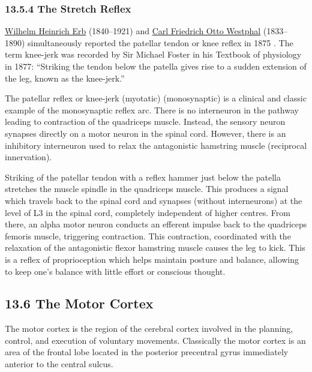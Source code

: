 \hypertarget{the-stretch-reflex}{%
\subsubsection{\texorpdfstring{{13.5.4} The Stretch
Reflex}{13.5.4 The Stretch Reflex}}\label{the-stretch-reflex}}

\href{https://en.wikipedia.org/wiki/Wilhelm_Heinrich_Erb}{Wilhelm
Heinrich Erb} (1840--1921) and
\href{https://en.wikipedia.org/wiki/Carl_Friedrich_Otto_Westphal}{Carl
Friedrich Otto Westphal} (1833--1890) simultaneously reported the
patellar tendon or knee reflex in 1875 . The term knee-jerk was recorded
by Sir Michael Foster in his Textbook of physiology in 1877: ``Striking
the tendon below the patella gives rise to a sudden extension of the
leg, known as the knee-jerk.''

The patellar reflex or knee-jerk (myotatic) (monosynaptic) is a clinical
and classic example of the monosynaptic reflex arc. There is no
interneuron in the pathway leading to contraction of the quadriceps
muscle. Instead, the sensory neuron synapses directly on a motor neuron
in the spinal cord. However, there is an inhibitory interneuron used to
relax the antagonistic hamstring muscle (reciprocal innervation).

Striking of the patellar tendon with a reflex hammer just below the
patella stretches the muscle spindle in the quadriceps muscle. This
produces a signal which travels back to the spinal cord and synapses
(without interneurons) at the level of L3 in the spinal cord, completely
independent of higher centres. From there, an alpha motor neuron
conducts an efferent impulse back to the quadriceps femoris muscle,
triggering contraction. This contraction, coordinated with the
relaxation of the antagonistic flexor hamstring muscle causes the leg to
kick. This is a reflex of proprioception which helps maintain posture
and balance, allowing to keep one's balance with little effort or
conscious thought.

\hypertarget{the-motor-cortex}{%
\subsection{\texorpdfstring{{13.6} The Motor
Cortex}{13.6 The Motor Cortex}}\label{the-motor-cortex}}

The motor cortex is the region of the cerebral cortex involved in the
planning, control, and execution of voluntary movements. Classically the
motor cortex is an area of the frontal lobe located in the posterior
precentral gyrus immediately anterior to the central sulcus.


